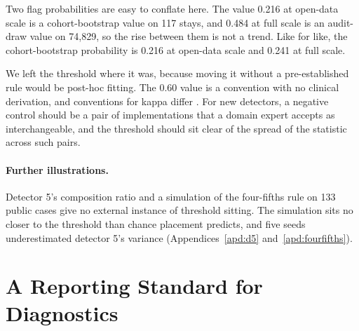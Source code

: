 \documentclass[10pt]{article}
\theoremstyle{definition}
\begin{document}
Two flag probabilities are easy to conflate here. The value 0.216 at open-data scale is a cohort-bootstrap value on 117 stays, and 0.484 at full scale is an audit-draw value on 74,829, so the rise between them is not a trend. Like for like, the cohort-bootstrap probability is 0.216 at open-data scale and 0.241 at full scale.

We left the threshold where it was, because moving it without a pre-established rule would be post-hoc fitting. The 0.60 value is a convention with no clinical derivation, and conventions for kappa differ \citep{mchugh2012kappa}. For new detectors, a negative control should be a pair of implementations that a domain expert accepts as interchangeable, and the threshold should sit clear of the spread of the statistic across such pairs.

\paragraph{Further illustrations.} Detector 5's composition ratio and a simulation of the four-fifths rule on 133 public cases give no external instance of threshold sitting. The simulation sits no closer to the threshold than chance placement predicts, and five seeds underestimated detector 5's variance (Appendices~\ref{apd:d5} and~\ref{apd:fourfifths}).

\section{A Reporting Standard for Diagnostics}
\label{sec:standard}
\end{document}
